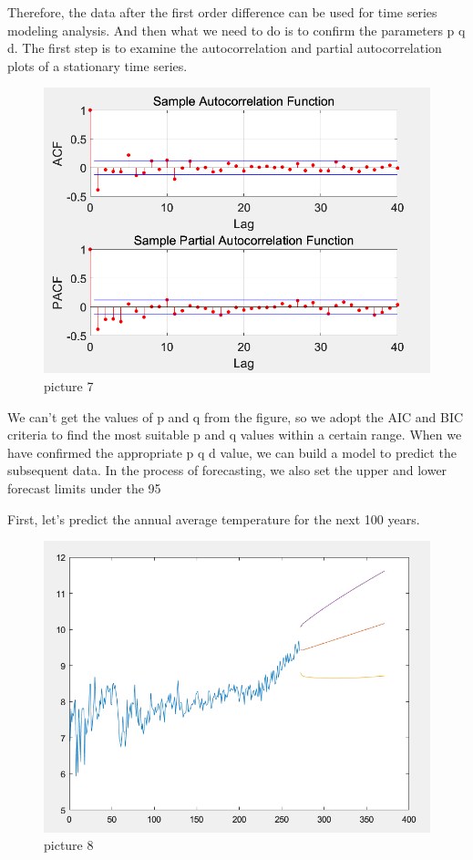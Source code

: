 \documentclass{apmcmthesis}
\begin{document}
Therefore, the data after the first order difference can be used for time series modeling analysis. And then what we need to do is to confirm the parameters p q d. The first step is to examine the autocorrelation and partial autocorrelation plots of a stationary time series.

\begin{figure}[htbp]
  \centering
  \includegraphics[scale=0.4]{ACF.png}
  \caption*{picture 7}\label{fig7}
\end{figure}

We can't get the values of p and q from the figure, so we adopt the AIC and BIC criteria to find the most suitable p and q values within a certain range. When we have confirmed the appropriate p q d value, we can build a model to predict the subsequent data. In the process of forecasting, we also set the upper and lower forecast limits under the 95%

First, let's predict the annual average temperature for the next 100 years.

\begin{figure}[htbp]
  \centering
  \includegraphics[scale=0.4]{ARIMA prediction 100.png}
  \caption*{picture 8}\label{fig8}
\end{figure}
\end{document}

